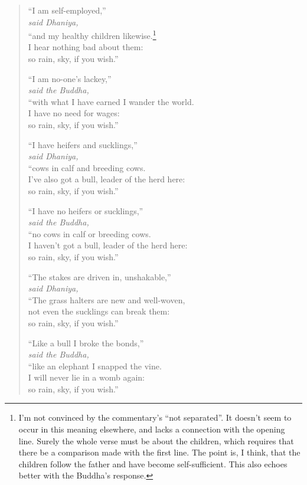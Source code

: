 \documentclass[12pt,openany]{book}%
\newcommand*{\scspeaker}[1]{\hspace{2em}\textit{#1}}
\begin{document}
\begin{verse}
“I am self-employed,” \\
\scspeaker{said Dhaniya, }\\
“and my healthy children likewise.\footnote{I’m not convinced by the commentary’s “not separated”. It doesn’t seem to occur in this meaning elsewhere, and lacks a connection with the opening line. Surely the whole verse must be about the children, which requires that there be a comparison made with the first line. The point is, I think, that the children follow the father and have become self-sufficient. This also echoes better with the Buddha’s response. } \\
I hear nothing bad about them: \\
so rain, sky, if you wish.” 

“I am no-one’s lackey,” \\
\scspeaker{said the Buddha, }\\
“with what I have earned I wander the world. \\
I have no need for wages: \\
so rain, sky, if you wish.” 

“I have heifers and sucklings,” \\
\scspeaker{said Dhaniya, }\\
“cows in calf and breeding cows. \\
I’ve also got a bull, leader of the herd here: \\
so rain, sky, if you wish.” 

“I have no heifers or sucklings,” \\
\scspeaker{said the Buddha, }\\
“no cows in calf or breeding cows. \\
I haven’t got a bull, leader of the herd here: \\
so rain, sky, if you wish.” 

“The stakes are driven in, unshakable,” \\
\scspeaker{said Dhaniya, }\\
“The grass halters are new and well-woven, \\
not even the sucklings can break them: \\
so rain, sky, if you wish.” 

“Like a bull I broke the bonds,” \\
\scspeaker{said the Buddha, }\\
“like an elephant I snapped the vine. \\
I will never lie in a womb again: \\
so rain, sky, if you wish.” 


\end{verse}
\end{document}
